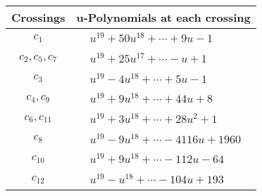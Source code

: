 \documentclass[1p]{elsarticle_modified}
\theoremstyle{definition}
\begin{document}
\begin{tabular}{m{50pt}|m{274pt}}
Crossings & \hspace{64pt}u-Polynomials at each crossing \\
\hline $$\begin{aligned}c_{1}\end{aligned}$$&$\begin{aligned}
&u^{19}+50 u^{18}+\cdots+9 u-1
\end{aligned}$\\
\hline $$\begin{aligned}c_{2},c_{5},c_{7}\end{aligned}$$&$\begin{aligned}
&u^{19}+25 u^{17}+\cdots- u+1
\end{aligned}$\\
\hline $$\begin{aligned}c_{3}\end{aligned}$$&$\begin{aligned}
&u^{19}-4 u^{18}+\cdots+5 u-1
\end{aligned}$\\
\hline $$\begin{aligned}c_{4},c_{9}\end{aligned}$$&$\begin{aligned}
&u^{19}+9 u^{18}+\cdots+44 u+8
\end{aligned}$\\
\hline $$\begin{aligned}c_{6},c_{11}\end{aligned}$$&$\begin{aligned}
&u^{19}+3 u^{18}+\cdots+28 u^2+1
\end{aligned}$\\
\hline $$\begin{aligned}c_{8}\end{aligned}$$&$\begin{aligned}
&u^{19}-9 u^{18}+\cdots-4116 u+1960
\end{aligned}$\\
\hline $$\begin{aligned}c_{10}\end{aligned}$$&$\begin{aligned}
&u^{19}+9 u^{18}+\cdots-112 u-64
\end{aligned}$\\
\hline $$\begin{aligned}c_{12}\end{aligned}$$&$\begin{aligned}
&u^{19}- u^{18}+\cdots-104 u+193
\end{aligned}$\\
\hline
\end{tabular}\\~\\
\end{document}
